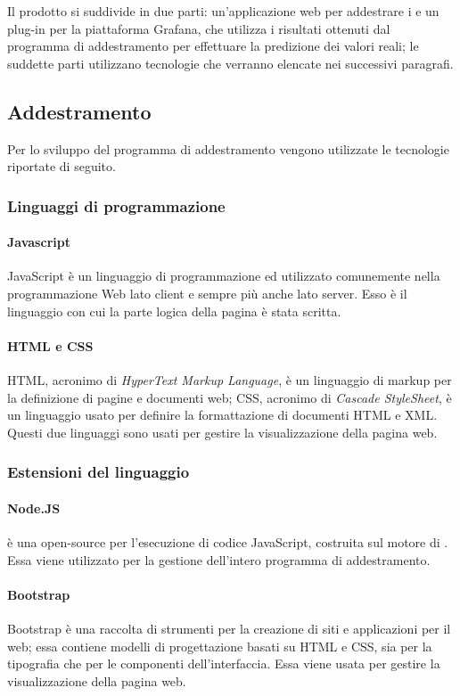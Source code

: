 \documentclass[../manuale-sviluppatore.tex]{subfiles}
\begin{document}
Il prodotto si suddivide in due parti: un'applicazione web per addestrare i  e un plug-in per la piattaforma Grafana, che
utilizza i risultati ottenuti dal programma di addestramento per effettuare la predizione dei valori reali;
le suddette parti utilizzano tecnologie che verranno elencate nei successivi paragrafi.

\subsection{Addestramento}%
\label{subs:addestramento}
Per lo sviluppo del programma di addestramento vengono utilizzate le tecnologie riportate di seguito.
\subsubsection{Linguaggi di programmazione}
\paragraph{Javascript}
JavaScript è un linguaggio di programmazione  ed  utilizzato comunemente nella programmazione Web lato client e sempre più anche lato server. Esso è il linguaggio con cui la parte logica della pagina è stata scritta.
\paragraph{HTML e CSS}
HTML, acronimo di \textit{HyperText Markup Language}, è un linguaggio di markup per la definizione di pagine e documenti web; CSS, acronimo di \textit{Cascade StyleSheet}, è un linguaggio usato per definire la formattazione di documenti HTML e XML. Questi due linguaggi sono usati per gestire la visualizzazione della pagina web.

\subsubsection{Estensioni del linguaggio}
\paragraph{Node.JS}
 è una  open-source per l'esecuzione di codice JavaScript, costruita sul motore  di . Essa viene utilizzato per la gestione dell'intero programma di addestramento.

\paragraph{Bootstrap}
Bootstrap è una raccolta di strumenti per la creazione di siti e applicazioni per il web; essa contiene modelli di progettazione basati su HTML e CSS, sia per la tipografia che per le componenti dell'interfaccia. Essa viene usata per gestire la visualizzazione della pagina web.
\end{document}
